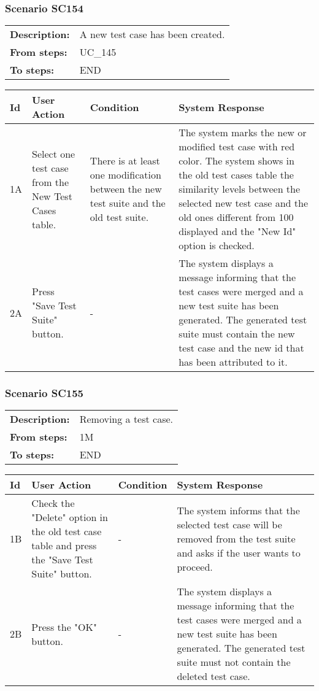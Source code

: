 \documentclass[a4paper,11pt]{article}
\newcommand{\bl}{\\ \hline}
\begin{document}
\subsubsection*{Scenario SC154}
\begin{tabular}{p{1in}p{4in}}
{\bf Description:} & A new test case has been created. \\
{\bf From steps:} & UC_145#2M \\
{\bf To steps:} & END \\
\end{tabular}
 
\begin{tabular}{|p{0.8in}|p{1.6in}|p{1.6in}|p{1.6in}|}
\hline
Id & User Action & Condition & System Response  \bl 
1A & Select one test case from the New Test Cases table.
					 & There is at least one modification between the new test
						suite and the old test suite.  & The system marks the new or modified test case with red
						color. The system shows in the old test cases table the similarity
						levels between the selected new test case and the old ones
						different from 100%
						displayed and the "New Id" option is checked. \bl 
2A & Press "Save Test Suite" button. & - & The system displays a message informing that the test
						cases were merged and a new test suite has been generated. The
						generated test suite must contain the new test case and the new id
						that has been attributed to it. \bl 
\end{tabular}
\subsubsection*{Scenario SC155}
\begin{tabular}{p{1in}p{4in}}
{\bf Description:} & Removing a test case. \\
{\bf From steps:} & 1M \\
{\bf To steps:} & END \\
\end{tabular}
 
\begin{tabular}{|p{0.8in}|p{1.6in}|p{1.6in}|p{1.6in}|}
\hline
Id & User Action & Condition & System Response  \bl 
1B & Check the "Delete" option in the old test case table and
						press the "Save Test Suite" button. & - & The system informs that the selected test case will be
						removed from the test suite and asks if the user wants to proceed.
					 \bl 
2B & Press the "OK" button. & - & The system displays a message informing that the test
						cases were merged and a new test suite has been generated. The
						generated test suite must not contain the deleted test case.
					 \bl 
\end{tabular}
\end{document}
